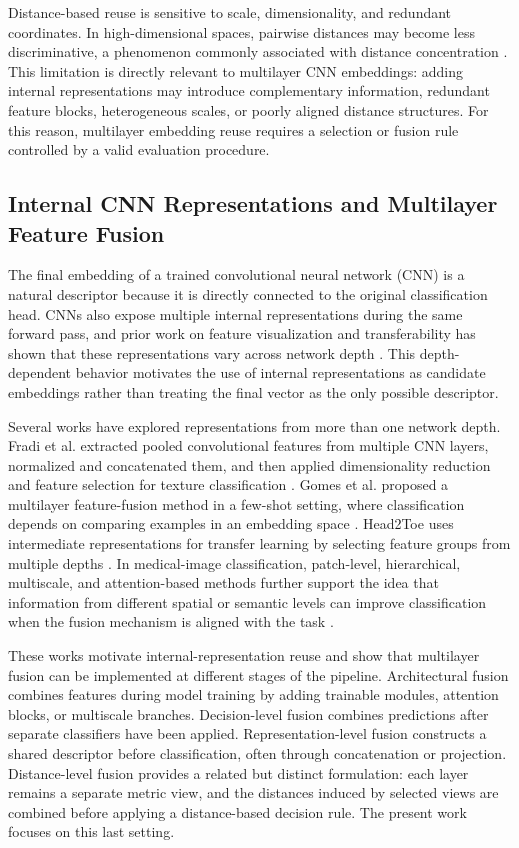 \documentclass[main.tex]{subfiles}
\begin{document}
Distance-based reuse is sensitive to scale, dimensionality, and redundant coordinates. In high-dimensional spaces, pairwise distances may become less discriminative, a phenomenon commonly associated with distance concentration \cite{beyer1997nearest}. This limitation is directly relevant to multilayer CNN embeddings: adding internal representations may introduce complementary information, redundant feature blocks, heterogeneous scales, or poorly aligned distance structures. For this reason, multilayer embedding reuse requires a selection or fusion rule controlled by a valid evaluation procedure.

\subsection{Internal CNN Representations and Multilayer Feature Fusion}

The final embedding of a trained convolutional neural network (CNN) is a natural descriptor because it is directly connected to the original classification head. CNNs also expose multiple internal representations during the same forward pass, and prior work on feature visualization and transferability has shown that these representations vary across network depth \cite{zeiler2014visualizing,yosinski2014transferable}. This depth-dependent behavior motivates the use of internal representations as candidate embeddings rather than treating the final vector as the only possible descriptor.

Several works have explored representations from more than one network depth. Fradi et al. extracted pooled convolutional features from multiple CNN layers, normalized and concatenated them, and then applied dimensionality reduction and feature selection for texture classification \cite{fradi2021multilayer}. Gomes et al. proposed a multilayer feature-fusion method in a few-shot setting, where classification depends on comparing examples in an embedding space \cite{gomes2023fmlf}. Head2Toe uses intermediate representations for transfer learning by selecting feature groups from multiple depths \cite{evci2022head2toe}. In medical-image classification, patch-level, hierarchical, multiscale, and attention-based methods further support the idea that information from different spatial or semantic levels can improve classification when the fusion mechanism is aligned with the task \cite{muezzinoglu2023patchresnet,ullah2025hierarchical,sankari2025hierarchical,he2025hemf,zhang2025context}.

These works motivate internal-representation reuse and show that multilayer fusion can be implemented at different stages of the pipeline. Architectural fusion combines features during model training by adding trainable modules, attention blocks, or multiscale branches. Decision-level fusion combines predictions after separate classifiers have been applied. Representation-level fusion constructs a shared descriptor before classification, often through concatenation or projection. Distance-level fusion provides a related but distinct formulation: each layer remains a separate metric view, and the distances induced by selected views are combined before applying a distance-based decision rule. The present work focuses on this last setting.
\end{document}
